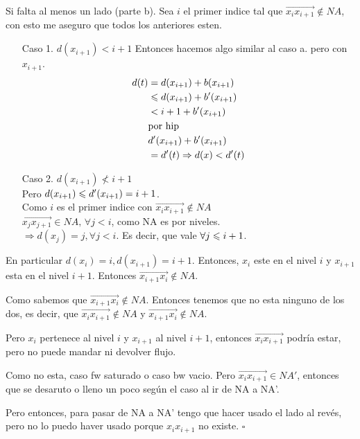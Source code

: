 \documentclass[12pt,a4paper]{article}
\begin{document}
Si falta al menos un lado (parte b). Sea $i$ el primer indice tal que $\overrightarrow{x_{i}x_{i+1}} \notin NA$, con 
esto me aseguro que todos los anteriores esten.
\begin{itemize}
    \item [Caso 1.] $d(x_{i+1}) < i+1$
        Entonces hacemos algo similar al caso a. pero con $x_{i+1}$.
        \begin{align*}
            d(t) &= d(x_{i+1}) + b(x_{i+1})\\
            &\leqslant d(x_{i+1}) + b'(x_{i+1})\\
            &< i + 1 + b'(x_{i+1})\\
            &\text{por hip}\\
            &d'(x_{i+1}) + b'(x_{i+1})\\
            &=d'(t) \Rightarrow d(x) < d'(t)\\
        \end{align*}
    \item [Caso 2.] $d(x_{i+1}) \nless i+1$\\
        Pero $d(x_{i+1}) \leqslant d'(x_{i+1}) = i+1$. \\
        Como $i$ es el primer indice con $\overrightarrow{x_{i}x_{i+1}} \notin NA$ \\
        $\overrightarrow{x_{j}x_{j+1}} \in NA,\, \forall j<i$, como NA es por niveles.\\
        $\Rightarrow d(x_{j}) = j, \forall j<i$. Es decir, que vale $\forall j \leqslant i+1$.
\end{itemize}

En particular $d(x_{i}) = i, d(x_{i+1})=i+1$. Entonces, $x_{i}$ este en el nivel $i$ 
y $x_{i+1}$ esta en el nivel $i+1$. Entonces $\overrightarrow{x_{i+1}x_{i}} \notin NA$.
\medskip

Como sabemos que $\overrightarrow{x_{i+1}x_{i}} \notin NA$. Entonces tenemos que no 
esta ninguno de los dos, es decir, que $\overrightarrow{x_{i}x_{i+1}} \notin NA$ y 
$\overrightarrow{x_{i+1}x_{i}} \notin NA$.
\medskip

Pero $x_{i}$ pertenece al nivel $i$ y $x_{i+1}$ al nivel $i+1$, entonces 
$\overrightarrow{x_{i}x_{i+1}}$ podría estar, pero no puede mandar ni devolver flujo.
\medskip

Como no esta, caso fw saturado o caso bw vacio. Pero $\overrightarrow{x_{i}x_{i+1}} \in NA'$,
entonces que se desaruto o lleno un poco según el caso al ir de NA a NA'.
\medskip

Pero entonces, para pasar de NA a NA' tengo que hacer usado el lado al revés, pero 
no lo puedo haver usado porque $x_{i}x_{i+1}$ no existe.
$\square$
\end{document}
